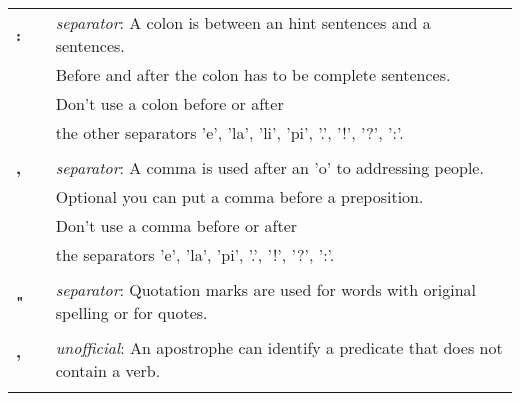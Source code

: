 \begin{supertabular}{p{2,5cm}|ll}
    \textbf{:}                   &  & \textit{separator}: A colon is between an hint sentences and a sentences.                                  \\
                                 &  & Before and after the colon has to be complete sentences.                                                   \\
                                 &  & Don't use a colon before or after                                                                          \\
                                 &  & the other separators 'e', 'la', 'li', 'pi', '.', '!', '?', ':'.                                            \\
                                 &  &                                                                                                            \\
    \textbf{,}                   &  & \textit{separator}: A comma is used after an 'o' to addressing people.                                     \\
                                 &  & Optional you can put a comma before a preposition.                                                         \\
                                 &  & Don't use a comma before or after                                                                          \\
                                 &  & the separators 'e', 'la', 'pi', '.', '!', '?', ':'.                                                        \\
                                 &  &                                                                                                            \\
    \textbf{"}                   &  & \textit{separator}: Quotation marks are used for words with original spelling or for quotes.               \\
                                 &  &                                                                                                            \\
    \textbf{'}                   &  & \textit{unofficial}: An apostrophe can identify a predicate that does not contain a verb.                  \\
                                 &  &                                                                                                            \\

\end{supertabular}
